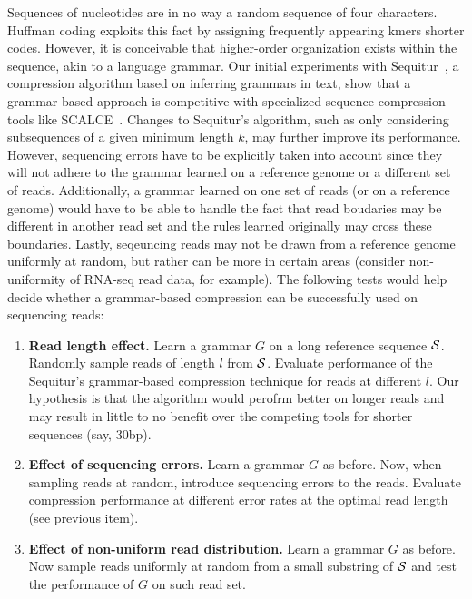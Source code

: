 \documentclass[12pt]{cmuthesis}
\begin{document}
  Sequences of nucleotides are in no way a random sequence of four characters. Huffman coding exploits this fact by assigning frequently appearing kmers shorter codes. However, it is conceivable that higher-order organization exists within the sequence, akin to a language grammar. Our initial experiments with Sequitur~\cite{Sequitur}, a compression algorithm based on inferring grammars in text, show that a grammar-based approach is competitive with specialized sequence compression tools like SCALCE~\cite{Sahinalp2012}. Changes to Sequitur's algorithm, such as only considering subsequences of a given minimum length $k$, may further improve its performance. However, sequencing errors have to be explicitly taken into account since they will not adhere to the grammar learned on a reference genome or a different set of reads. Additionally, a grammar learned on one set of reads (or on a reference genome) would have to be able to handle the fact that read boudaries may be different in another read set and the rules learned originally may cross these boundaries. Lastly, seqeuncing reads may not be drawn from a reference genome uniformly at random, but rather can be  more in certain areas (consider non-uniformity of RNA-seq read data, for example). The following tests would help decide whether a grammar-based compression can be successfully used on sequencing reads:
  \begin{enumerate}
    \item \textbf{Read length effect.} Learn a grammar $G$ on a long reference sequence $\mathcal{S}$. Randomly sample reads of length $l$ from $\mathcal{S}$. Evaluate performance of the Sequitur's grammar-based compression technique for reads at different $l$. Our hypothesis is that the algorithm would perofrm better on longer reads and may result in little to no benefit over the competing tools for shorter sequences (say, 30bp).

    \item \textbf{Effect of sequencing errors.} Learn a grammar $G$ as before. Now, when sampling reads at random, introduce sequencing errors to the reads. Evaluate compression performance at different error rates at the optimal read length (see previous item).

    \item \textbf{Effect of non-uniform read distribution.} Learn a grammar $G$ as before. Now sample reads uniformly at random from a small substring of $\mathcal{S}$ and test the performance of $G$ on such read set.
  \end{enumerate}
\end{document}
